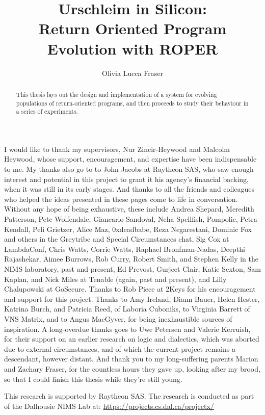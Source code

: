 \title{Urschleim in Silicon:\\Return Oriented Program\\Evolution with ROPER}
\author{Olivia Lucca Fraser}

\mcs
{}

\frontmatter

\begin{abstract}
  This thesis lays out the design and implementation of a system for
  evolving populations of return-oriented programs, and then proceeds to study their
  behaviour in a series of experiments. 
\end{abstract}

\begin{acknowledgements}
I would like to thank my supervisors, Nur Zincir-Heywood and Malcolm Heywood,
whose support, encouragement, and expertise have been indispensable to me. My
thanks also go to to John Jacobs at Raytheon SAS, who saw enough interest and
potential in this project to grant it his agency's financial backing, when it
was still in its early stages. And thanks to all the friends and colleagues who
helped the ideas presented in these pages come to life in conversation. Without
any hope of being exhaustive, these include Andrea Shepard, Meredith Patterson,
Pete Wolfendale, Giancarlo Sandoval, Neha Spellfish, Pompolic, Petra Kendall,
Peli Grietzer, Alice Maz, 0xdeadbabe, Reza Negarestani, Dominic Fox and others
in the Greytribe and Special Circumstances chat, Sig Cox at LambdaConf, Chris
Watts, Corrie Watts, Raphael Bronfman-Nadas, Deepthi Rajashekar, Aimee Burrows,
Rob Curry, Robert Smith, and Stephen Kelly in the NIMS laboratory, past and
present, Ed Prevost, Gurjeet Clair, Katie Sexton, Sam Kaplan, and Nick Miles at
Tenable (again, past and present), and Lilly Chalupowski at GoSecure. Thanks to Rob Piece at 2Keys for his
encouragement and support for this project.
Thanks to Amy Ireland,
Diann Bauer, Helen Hester, Katrina Burch, and Patricia Reed, of Laboria
Cuboniks, to Virginia Barrett of VNS Matrix, and to Angus MacGyver, for
being inexhaustible sources of inspiration. A long-overdue thanks goes
to Uwe Petersen and Valerie
Kerruish, for their support on an earlier research on logic and dialectics,
which was aborted due to external circumstances, and of which
the current project remains a descendant, however distant. 
And thank you to my
long-suffering parents Marion and Zachary Fraser, for the countless hours they
gave up, looking after my brood, so that I could finish this thesis while they're
still young. 

This research is supported by Raytheon SAS. The research is conducted
as part of the Dalhousie NIMS Lab at: \url{https://projects.cs.dal.ca/projectx/}
\end{acknowledgements}

\printnoidxglossaries
\clearpage
{}
\mainmatter
